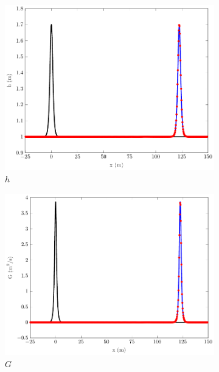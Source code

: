 \documentclass[10pt]{elsarticle}
\begin{document}
\begin{figure}
	\centering
	\begin{subfigure}{0.32\textwidth}
		\centering
		\includegraphics[width=\textwidth]{./Figures/Simulations/Validation/Serre/h.pdf}
		\caption{$h$}
	\end{subfigure}
	\begin{subfigure}{0.32\textwidth}
		\centering
		\includegraphics[width=\textwidth]{./Figures/Simulations/Validation/Serre/G.pdf}
		\caption{$G$}
	\end{subfigure}
	\begin{subfigure}{0.32\textwidth}
		\centering

\end{subfigure}
\end{figure}
\end{document}

